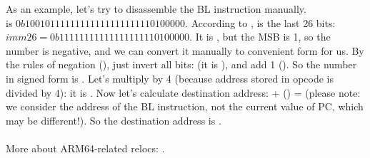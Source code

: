 As an example, let's try to disassemble the BL instruction manually.\\
 is $0b10010111111111111111111110100000$.
According to ,  is the last 26 bits:\\
$imm26 = 0b11111111111111111110100000$.
It is , but the \ac{MSB} is 1, 
so the number is negative, and we can convert it manually to convenient form for us.
By the rules of negation (), just invert all bits: (it is ), and add 1 ().
So the number in signed form is .
Let's multiply  by 4 (because address stored in opcode is divided by 4): it is .
Now let's calculate destination address:  + () =  
(please note: we consider the address of the BL instruction, not the current value of \ac{PC}, which may be different!).
So the destination address is .\\
\\
More about ARM64-related relocs: \ARMELF.
